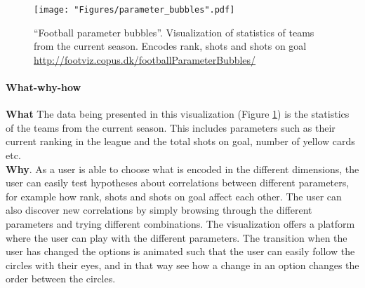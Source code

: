 \documentclass[Report.tex]{subfiles}
\begin{document}
\begin{figure}
\center
\texttt{[image: "Figures/parameter\_bubbles".pdf]}
\caption{``Football parameter bubbles''. Visualization of statistics of teams from the current season. Encodes rank, shots and shots on goal \url{http://footviz.copus.dk/footballParameterBubbles/}}
\label{Fig:Bubbleviz}
\end{figure}

\paragraph{What-why-how\\}
\textbf{What} The data being presented in this visualization (Figure \ref{Fig:Bubbleviz}) is the statistics of the teams from the current season. This includes parameters such as their current ranking in the league and the total shots on goal, number of yellow cards etc.\\

\noindent \textbf{Why}. As a user is able to choose what is encoded in the different dimensions, the user can easily test hypotheses about correlations between different parameters, for example how rank, shots and shots on goal affect each other. The user can also discover new correlations by simply browsing through the different parameters and trying different combinations. The visualization offers a platform where the user can play with the different parameters. The transition when the user has changed the options is animated such that the user can easily follow the circles with their eyes, and in that way see how a change in an option changes the order between the circles.\\
\end{document}
